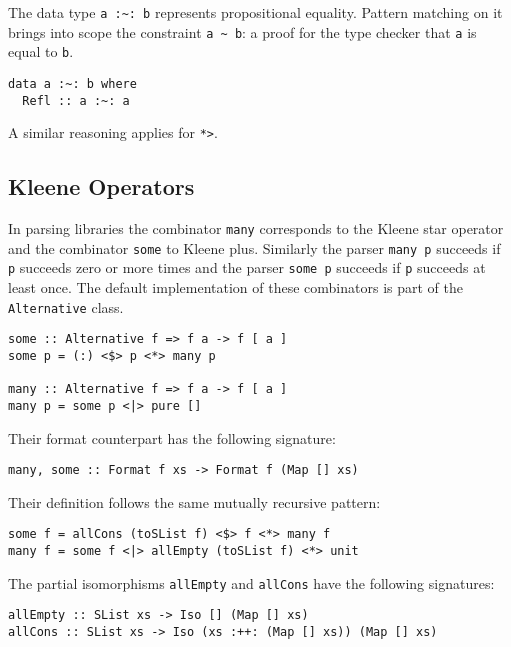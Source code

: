 \documentclass[../Thesis.tex]{subfiles}
\begin{document}
The data type \texttt{a :\textasciitilde: b} represents propositional equality. Pattern matching on it brings into scope the constraint \texttt{a \textasciitilde\ b}: a proof for the type checker that \texttt{a} is equal to \texttt{b}.

\begin{verbatim}
data a :~: b where
  Refl :: a :~: a
\end{verbatim}

A similar reasoning applies for \texttt{*>}.

\subsection{Kleene Operators}
\label{subsec:Many}
In parsing libraries the combinator \texttt{many} corresponds to the Kleene star operator and the combinator \texttt{some} to Kleene plus. Similarly the parser \texttt{many p} succeeds if \texttt{p} succeeds zero or more times
and the parser \texttt{some p} succeeds if \texttt{p} succeeds at least once.
The default implementation of these combinators is part of the \texttt{Alternative} class. 
\begin{verbatim}
some :: Alternative f => f a -> f [ a ]
some p = (:) <$> p <*> many p

many :: Alternative f => f a -> f [ a ]
many p = some p <|> pure []
\end{verbatim}

Their format counterpart has the following signature:
\begin{verbatim}
many, some :: Format f xs -> Format f (Map [] xs)
\end{verbatim}

Their definition follows the same mutually recursive pattern:
\begin{verbatim}
some f = allCons (toSList f) <$> f <*> many f
many f = some f <|> allEmpty (toSList f) <*> unit
\end{verbatim}

The partial isomorphisms \texttt{allEmpty} and \texttt{allCons} have the following signatures:

\begin{verbatim}
allEmpty :: SList xs -> Iso [] (Map [] xs)
allCons :: SList xs -> Iso (xs :++: (Map [] xs)) (Map [] xs)
\end{verbatim}

\end{document}
